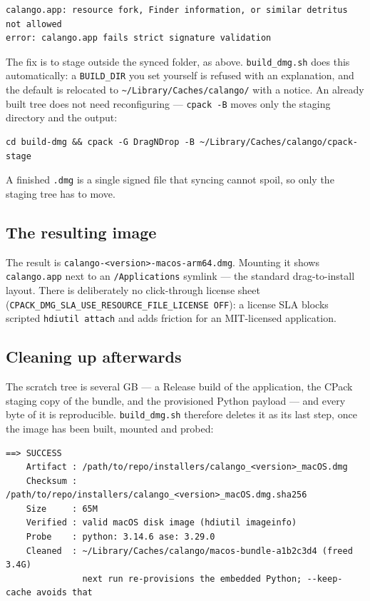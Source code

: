 \documentclass[11pt,a4paper]{article}
\newcommand{\file}[1]{\texttt{#1}}
\newcommand{\opt}[1]{\texttt{#1}}
\begin{document}
\begin{lstlisting}[basicstyle=\ttfamily\scriptsize]
calango.app: resource fork, Finder information, or similar detritus not allowed
error: calango.app fails strict signature validation
\end{lstlisting}

\noindent The fix is to stage outside the synced folder, as above.
\file{build\_dmg.sh} does this automatically: a \opt{BUILD\_DIR} you set
yourself is refused with an explanation, and the default is relocated to
\file{\textasciitilde/Library/Caches/calango/} with a notice. An already
built tree does not need reconfiguring --- \opt{cpack -B} moves only the
staging directory and the output:

\begin{lstlisting}
cd build-dmg && cpack -G DragNDrop -B ~/Library/Caches/calango/cpack-stage
\end{lstlisting}

\noindent A finished \file{.dmg} is a single signed file that syncing
cannot spoil, so only the staging tree has to move.

\subsection{The resulting image}

The result is \file{calango-<version>-macos-arm64.dmg}. Mounting
it shows \file{calango.app} next to an \file{/Applications} symlink ---
the standard drag-to-install layout. There is deliberately no
click-through license sheet
(\opt{CPACK\_DMG\_SLA\_USE\_RESOURCE\_FILE\_LICENSE OFF}): a license SLA
blocks scripted \file{hdiutil attach} and adds friction for an
MIT-licensed application.

\subsection{Cleaning up afterwards}
\label{sec:dmg-cleanup}

The scratch tree is several GB --- a Release build of the application,
the CPack staging copy of the bundle, and the provisioned Python payload
--- and every byte of it is reproducible. \file{build\_dmg.sh} therefore
deletes it as its last step, once the image has been built, mounted and
probed:

\begin{lstlisting}[basicstyle=\ttfamily\scriptsize]
==> SUCCESS
    Artifact : /path/to/repo/installers/calango_<version>_macOS.dmg
    Checksum : /path/to/repo/installers/calango_<version>_macOS.dmg.sha256
    Size     : 65M
    Verified : valid macOS disk image (hdiutil imageinfo)
    Probe    : python: 3.14.6 ase: 3.29.0
    Cleaned  : ~/Library/Caches/calango/macos-bundle-a1b2c3d4 (freed 3.4G)
               next run re-provisions the embedded Python; --keep-cache avoids that
\end{lstlisting}
\end{document}

